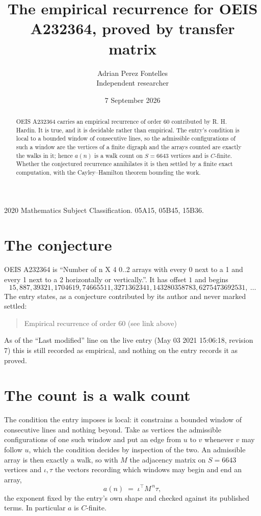\documentclass[11pt,a4paper]{article}
\title{The empirical recurrence for OEIS A232364, proved by transfer matrix}
\author{Adrian Perez Fontelles\\ \small Independent researcher}
\date{7 September 2026}
\theoremstyle{plain}
\theoremstyle{definition}
\begin{document}
\maketitle

\begin{abstract}
OEIS A232364 carries an empirical recurrence of order $60$ contributed by R. H. Hardin. It is
true, and it is decidable rather than empirical. The entry's condition is local to a bounded window of consecutive lines, so
the admissible configurations of such a window are the vertices of a finite digraph and the
arrays counted are exactly the walks in it; hence $a(n)$ is a walk count on $S=6643$ vertices
and is $C$-finite. Whether the conjectured recurrence annihilates it is then settled by a
finite exact computation, with the Cayley--Hamilton theorem bounding the work.
\end{abstract}

\noindent\small 2020 Mathematics Subject Classification. 05A15, 05B45, 15B36.\normalsize

\section{The conjecture}

OEIS A232364 is ``Number of n X 4 0..2 arrays with every 0 next to a 1 and every 1 next to a 2 horizontally or vertically.''. It has offset $1$ and begins
\[
15, 887, 39321, 1704619, 74665511, 3271362341, 143280358783, 6275473692531,\ \dots
\]
The entry states, as a conjecture contributed by its author and never marked settled:
\begin{quote}
Empirical recurrence of order 60 (see link above)
\end{quote}
As of the ``Last modified'' line on the live entry (May 03 2021 15:06:18, revision 7) this is still
recorded as empirical, and nothing on the entry records it as proved.

\section{The count is a walk count}

The condition the entry imposes is local: it constrains a bounded window of consecutive lines and nothing beyond. Take as
vertices the admissible configurations of one such window and put an edge from $u$ to $v$
whenever $v$ may follow $u$, which the condition decides by inspection of the two. An
admissible array is then exactly a walk, so with $M$ the adjacency matrix on $S=6643$ vertices
and $\iota,\tau$ the vectors recording which windows may begin and end an array,
\[
a(n)\;=\;\iota^{\!\top}M^{\,n}\tau ,
\]
the exponent fixed by the entry's own shape and checked against its published terms. In
particular $a$ is $C$-finite.
\end{document}
